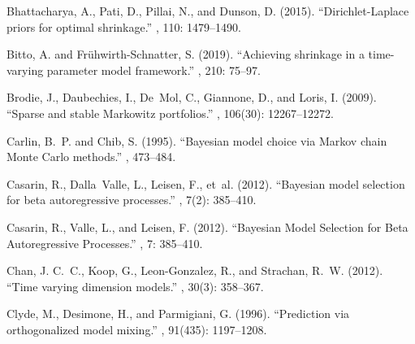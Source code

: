 \documentclass[ba]{imsart}
\numberwithin{equation}{section}
\theoremstyle{plain}
\begin{document}
\begin{thebibliography}{70}
Bhattacharya, A., Pati, D., Pillai, N., and Dunson, D. (2015).
\newblock \enquote{Dirichlet-Laplace priors for optimal shrinkage.}
, 110:
  1479--1490.
\endbibitem

Bitto, A. and Fr{\"u}hwirth-Schnatter, S. (2019).
\newblock \enquote{Achieving shrinkage in a time-varying parameter model
  framework.}
, 210: 75--97.
\endbibitem

Brodie, J., Daubechies, I., De~Mol, C., Giannone, D., and Loris, I. (2009).
\newblock \enquote{Sparse and stable Markowitz portfolios.}
, 106(30):
  12267--12272.
\endbibitem

Carlin, B.~P. and Chib, S. (1995).
\newblock \enquote{Bayesian model choice via Markov chain Monte Carlo methods.}
, 473--484.
\endbibitem

Casarin, R., Dalla~Valle, L., Leisen, F., et~al. (2012{}).
\newblock \enquote{Bayesian model selection for beta autoregressive processes.}
, 7(2): 385--410.
\endbibitem

Casarin, R., Valle, L., and Leisen, F. (2012{}).
\newblock \enquote{Bayesian Model Selection for Beta Autoregressive Processes.}
, 7: 385--410.
\endbibitem

Chan, J. C.~C., Koop, G., Leon-Gonzalez, R., and Strachan, R.~W. (2012).
\newblock \enquote{Time varying dimension models.}
, 30(3): 358--367.
\endbibitem

Clyde, M., Desimone, H., and Parmigiani, G. (1996).
\newblock \enquote{Prediction via orthogonalized model mixing.}
, 91(435):
  1197--1208.
\endbibitem


\end{thebibliography}
\end{document}
